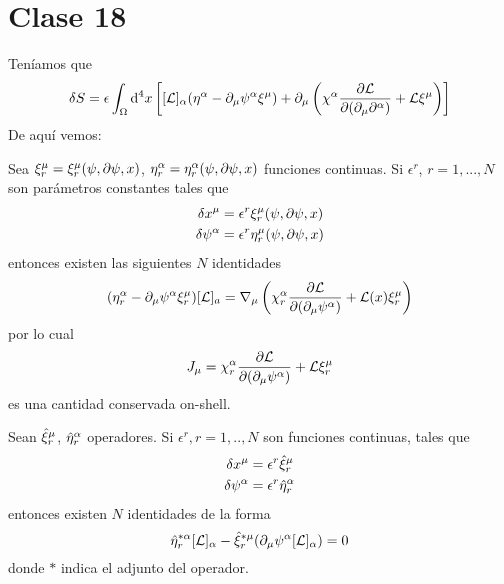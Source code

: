 \section{Clase 18}
Teníamos que
\begin{equation}
  \delta S=\epsilon\int_\Omega\dd^4x\left[[\mathcal{L} ]_\alpha (\eta^\alpha -\partial_\mu \psi^\alpha \xi^\mu )+\partial_\mu \left(\chi^\alpha \pdv{\mathcal{L}}{(\partial_\mu\partial^\alpha)}+\mathcal{L} \xi^\mu  \right)\right]
\end{equation}
De aquí vemos:
\begin{teor}\label{teo1}
	Sea $\xi_r^\mu =\xi_r^\mu (\psi,\partial \psi,x)$, $\eta_r^\alpha  =\eta_r^\alpha  (\psi,\partial \psi,x)$ funciones continuas. Si $\epsilon^r$, $r=1,...,N$ son parámetros constantes tales que
	\begin{align}
  \delta x^\mu &=\epsilon^r\xi_r^\mu (\psi,\partial\psi ,x)\\
  \delta \psi^\alpha  &=\epsilon^r\eta_r^\mu (\psi,\partial\psi ,x)
\end{align}
entonces existen las siguientes $N$ identidades
\begin{equation}
  (\eta_r^\alpha -\partial_\mu \psi^\alpha \xi_r^\mu )[\mathcal{L} ]_a =\nabla_\mu \left(\chi_r^\alpha \pdv{\mathcal{L}}{(\partial_\mu\psi^\alpha)}+\mathcal{L} (x)\xi_r^\mu \right)
\end{equation}
por lo cual
\begin{equation}
  J_\mu =\chi_r^\alpha \pdv{\mathcal{L}}{(\partial_\mu\psi^\alpha)}+\mathcal{L} \xi_r^\mu 
\end{equation}
es una cantidad conservada on-shell.
\end{teor}

\begin{teor}\label{teo1}
	Sean $\hat{\xi}_r^\mu $, $\hat{\eta}_r^\alpha $ operadores. Si $\epsilon^r, r=1,..,N$ son funciones continuas, tales que
	\begin{align}
  \delta x^\mu &=\epsilon^r\hat{\xi}_r^\mu \\
  \delta\psi^\alpha &=\epsilon^r\hat{\eta}_r^\alpha 
\end{align}
entonces existen $N$ identidades de la forma
\begin{equation}
  \hat{\eta}_r^{*\alpha}[\mathcal{L} ]_\alpha -\hat{\xi}_r^{*\mu }(\partial_\mu \psi^\alpha [\mathcal{L} ]_\alpha )=0
\end{equation}
donde $*$ indica el adjunto del operador.
\end{teor}

